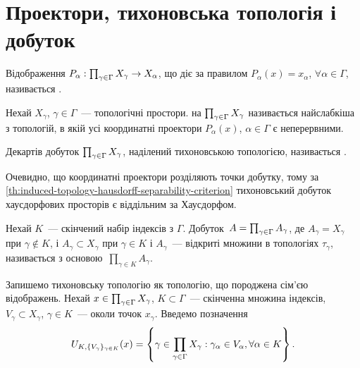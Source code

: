 \section{Проектори, тихоновська топологія і добуток}

\begin{definition}
    Відображення $P_\alpha: \prod_{\gamma\in\Gamma}{X}_\gamma \to X_\alpha$, що діє за правилом $P_\alpha(x) = x_\alpha$, $\forall \alpha \in \Gamma$, називається .
\end{definition}

\begin{definition}
    Нехай $X_\gamma$, $\gamma \in \Gamma$~--- топологічні простори.  на $\prod_{\gamma\in\Gamma}{X}_\gamma$ називається найслабкіша з топологій, в якій усі координатні проектори $P_\alpha(x)$, $\alpha \in \Gamma$ є неперервними.
\end{definition}

\begin{definition}
    Декартів добуток $\prod_{\gamma\in\Gamma}{X}_\gamma$, наділений тихоновською топологією, називається .
\end{definition}

\begin{remark}
    Очевидно, що координатні проектори розділяють точки добутку, тому за \cref{th:induced-topology-hausdorff-separability-criterion} тихоновський добуток хаусдорфових просторів є віддільним за Хаусдорфом.
\end{remark}

\begin{definition}
    Нехай $K$~--- скінчений набір індексів з $\Gamma$. Добуток~$A = \prod_{\gamma\in\Gamma}{A}_\gamma$, де $A_\gamma =  X_\gamma$ при $\gamma \notin K$, і $A_\gamma \subset X_\gamma$ при $\gamma \in K$ і $A_\gamma$~--- відкриті множини в топологіях $\tau_\gamma$, називається  з основою~$\prod_{\gamma \in K} A_\gamma$.
\end{definition}

Запишемо тихоновську топологію як топологію, що породжена сім'єю відображень. Нехай $x \in \prod_{\gamma\in\Gamma}{X}_\gamma$, $K \subset \Gamma$~--- скінченна множина індексів, $V_\gamma \subset X_\gamma$, $\gamma \in K$~--- околи точок $x_\gamma$. Введемо позначення
\begin{equation*}
    U_{K,\{V_\gamma\}_{\gamma\in K}}(x) =
    \left\{ \gamma \in \prod_{\gamma\in\Gamma}{X}_\gamma: \gamma_\alpha \in V_\alpha, \forall \alpha \in K \right\}.
\end{equation*}

